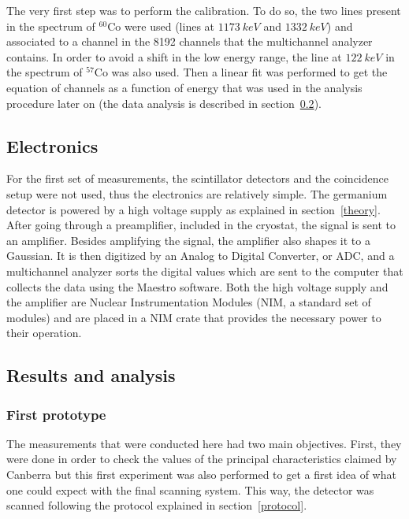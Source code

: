 \documentclass[11pt,a4paper]{article}
\begin{document}
The very first step was to perform the calibration. To do so, the two lines present in the spectrum of $^{60}$Co were used (lines at $1173~keV$ and $1332~keV$) and associated to a channel in the 8192 channels that the multichannel analyzer contains. In order to avoid a shift in the low energy range, the line at $122~keV$ in the spectrum of $^{57}$Co was also used. Then a linear fit was performed to get the equation of channels as a function of energy that was used in the analysis procedure later on (the data analysis is described in section~\ref{analysis}).

\subsection{Electronics}

For the first set of measurements, the scintillator detectors and the coincidence setup were not used, thus the electronics are relatively simple. The germanium detector is powered by a high voltage supply as explained in section~\ref{theory}. After going through a preamplifier, included in the cryostat, the signal is sent to an amplifier. Besides amplifying the signal, the amplifier also shapes it to a Gaussian. It is then digitized by an Analog to Digital Converter, or ADC, and a multichannel analyzer sorts the digital values which are sent to the computer that collects the data using the Maestro software. Both the high voltage supply and the amplifier are Nuclear Instrumentation Modules (NIM, a standard set of modules) and are placed in a NIM crate that provides the necessary power to their operation.

\subsection{Results and analysis} \label{analysis}

\subsubsection{First prototype}

The measurements that were conducted here had two main objectives. First, they were done in order to check the values of the principal characteristics claimed by Canberra but this first experiment was also performed to get a first idea of what one could expect with the final scanning system. This way, the detector was scanned following the protocol explained in section~\ref{protocol}.
\end{document}
